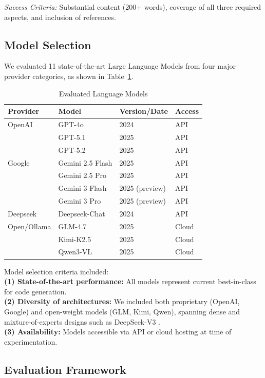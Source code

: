 \textit{Success Criteria:} Substantial content (200+ words), coverage of all three required aspects, and inclusion of references.

\subsection{Model Selection}
\label{sec:models}

We evaluated 11 state-of-the-art Large Language Models from four major provider categories, as shown in Table~\ref{tab:models}.

\begin{table}[htbp]
\centering
\caption{Evaluated Language Models}
\label{tab:models}
\begin{tabular}{llll}
\toprule
\textbf{Provider} & \textbf{Model} & \textbf{Version/Date} & \textbf{Access} \\
\midrule
OpenAI & GPT-4o & 2024 & API \\
& GPT-5.1 & 2025 & API \\
& GPT-5.2 & 2025 & API \\
\midrule
Google & Gemini 2.5 Flash & 2025 & API \\
& Gemini 2.5 Pro & 2025 & API \\
& Gemini 3 Flash & 2025 (preview) & API \\
& Gemini 3 Pro & 2025 (preview) & API \\
\midrule
Deepseek & Deepseek-Chat & 2024 & API \\
\midrule
Open/Ollama & GLM-4.7 & 2025 & Cloud \\
& Kimi-K2.5 & 2025 & Cloud \\
& Qwen3-VL & 2025 & Cloud \\
\bottomrule
\end{tabular}
\end{table}

Model selection criteria included:\\
\textbf{(1) State-of-the-art performance:} All models represent current best-in-class for code generation.\\
\textbf{(2) Diversity of architectures:} We included both proprietary (OpenAI, Google) and open-weight models (GLM, Kimi, Qwen), spanning dense and mixture-of-experts designs such as DeepSeek-V3 \cite{deepseekv3}.\\
\textbf{(3) Availability:} Models accessible via API or cloud hosting at time of experimentation.

\subsection{Evaluation Framework}
\label{sec:evaluation}

